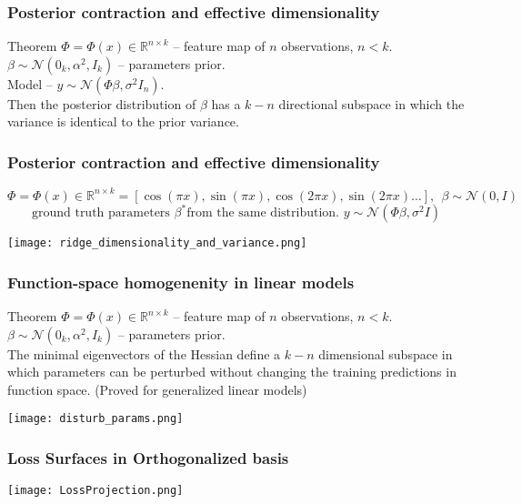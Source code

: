 \documentclass[10pt]{beamer}
\begin{document}
\begin{frame}
    \frametitle{Posterior contraction and effective dimensionality}
    \begin{block}{Theorem}
        $\Phi = \Phi(x)\in \mathbb{R}^{n\times k}$ -- feature map of $n$ observations, $n<k$. \\
        $\beta \sim \mathcal{N}(0_k, \alpha^2, I_k)$ -- parameters prior. \\
        Model -- $y\sim \mathcal{N}(\Phi\beta, \sigma^2I_n)$.\\
        Then the posterior distribution of $\beta$ has a $k-n$ directional subspace in which the variance is identical to the prior variance.
    \end{block}
    
\end{frame}

\begin{frame}
    \frametitle{Posterior contraction and effective dimensionality}
    $$\Phi = \Phi(x)\in \mathbb{R}^{n\times k} = \left[\cos(\pi x), \sin(\pi x), \cos(2\pi x), \sin(2\pi x)\dots \right], ~~\beta\sim \mathcal{N}(0, I)$$
    $$\text{ground truth parameters }\beta^* \text{from the same distribution. } y\sim \mathcal{N}(\Phi\beta, \sigma^2 I)$$
    \begin{center}
        \texttt{[image: ridge\_dimensionality\_and\_variance.png]}
    \end{center}
    
\end{frame}

\begin{frame}
    \frametitle{Function-space homogenenity in linear models}
    \begin{block}{Theorem}
        $\Phi = \Phi(x)\in \mathbb{R}^{n\times k}$ -- feature map of $n$ observations, $n<k$.\\
        $\beta \sim \mathcal{N}(0_k, \alpha^2, I_k)$ -- parameters prior.\\
        The minimal eigenvectors of the Hessian define a $k - n$ dimensional subspace in which parameters can be perturbed without changing the training predictions in function space. (Proved for generalized linear models)
    \end{block}
    \begin{center}
        \texttt{[image: disturb\_params.png]}
    \end{center}
\end{frame} 

\begin{frame}
    \frametitle{Loss Surfaces in Orthogonalized basis}
    \begin{center}
        \texttt{[image: LossProjection.png]}
    \end{center}
\end{frame}
\end{document}
